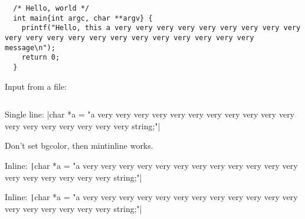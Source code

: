 \documentclass{article}
\begin{document}
\begin{verbatim}
  /* Hello, world */
  int main{int argc, char **argv} {
    printf("Hello, this a very very very very very very very very very very very very very very very very very very very very very message\n");
    return 0;
  }
\end{verbatim}

Input from a file:

\inputminted[]{c}{../code/helloworld.c}

Single line: |char *a = "a very very very very very very very very very very very very very very very very very very string;"|

Don't set bgcolor, then mintinline works. 

Inline: \texttt|char *a = "a very very very very very very very very very very very very very very very very very very string;"|

Inline: \texttt|char *a = "a very very very very very very very very very very very very very very very very very very string;"|
\end{document}
